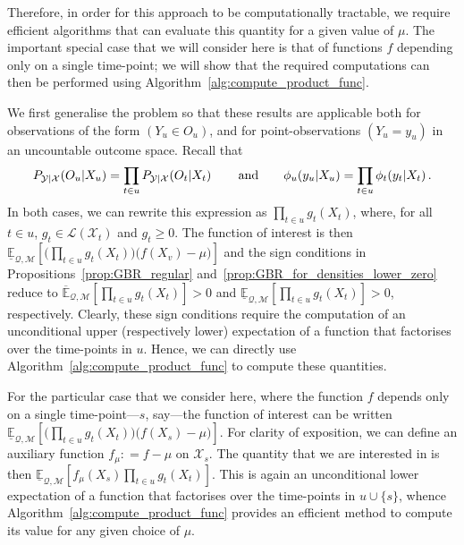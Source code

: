 \documentclass[3p]{elsarticle}
\newcommand{\states}{\mathcal{X}}
\newcommand{\observs}{\mathcal{Y}}
\newcommand{\lexp}{\underline{\mathbb{E}}_{\rateset,\mathcal{M}}}
\newcommand{\uexp}{\overline{\mathbb{E}}_{\rateset,\mathcal{M}}}
\newcommand{\gambles}{\mathcal{L}}
\newcommand{\rateset}{\mathcal{Q}}
\newcommand{\coloneqq}{:\!=}
\begin{document}
Therefore, in order for this approach to be computationally tractable, we require efficient algorithms that can evaluate this quantity for a given value of $\mu$. The important special case that we will consider here is that of functions $f$ depending only on a single time-point; we will show that the required computations can then be performed using Algorithm~\ref{alg:compute_product_func}.%

We first generalise the problem so that these results are applicable both for observations of the form $(Y_u\in O_u)$, and for point-observations $(Y_u=y_u)$ in an uncountable outcome space. Recall that 
\begin{equation*}
P_{\observs\vert\states}(O_u\vert X_u) = \prod_{t\in u}P_{\observs\vert\states}(O_{t}\vert X_{t})\,\quad\quad\text{and}\quad\quad \phi_u(y_u\vert X_u) = \prod_{t\in u}\phi_{t}(y_{t}\vert X_{t})\,.\vspace{-5pt}
\end{equation*}
In both cases, we can rewrite this expression as $\prod_{t\in u}g_{t}(X_{t})$, where, for all $t\in u$, $g_{t}\in\gambles(\states_{t})$ and $g_{t}\geq 0$. The function of interest is then
$\lexp\left[ \bigl(\prod_{t\in u}g_{t}(X_{t})\bigr)\bigl(f(X_v) - \mu\bigr) \right]$ and the sign conditions in Propositions~\ref{prop:GBR_regular} and~\ref{prop:GBR_for_densities_lower_zero} reduce to $\uexp[\prod_{t\in u} g_{t}(X_{t})]>0$ and $\lexp[\prod_{t\in u} g_{t}(X_{t})]>0$, respectively. Clearly, these sign conditions require the computation of an unconditional upper (respectively lower) expectation of a function that factorises over the time-points in $u$. Hence, we can directly use Algorithm~\ref{alg:compute_product_func} to compute these quantities.

For the particular case that we consider here, where the function $f$ depends only on a single time-point---$s$, say---the function of interest can be written $\lexp\left[ \bigl(\prod_{t\in u}g_{t}(X_{t})\bigr)\bigl(f(X_s) - \mu\bigr) \right]$. For clarity of exposition, we can define an auxiliary function $f_\mu\coloneqq f-\mu$ on $\states_s$. The quantity that we are interested in is then $\lexp\left[ f_\mu(X_s)\prod_{t\in u}g_{t}(X_{t}) \right]$. This is again an unconditional lower expectation of a function that factorises over the time-points in $u\cup\{s\}$, whence Algorithm~\ref{alg:compute_product_func} provides an efficient method to compute its value for any given choice of $\mu$.
\end{document}
